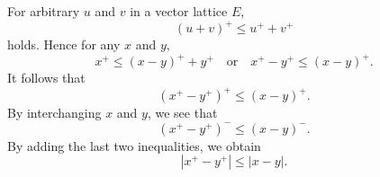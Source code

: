 For arbitrary $u$ and $v$ in a vector lattice $E$, $$(u+v)^+ \leq u^+ + v^+$$ holds. Hence for any $x$ and $y$, $$x^+ \leq (x-y)^+ + y^+ \quad \text{or} \quad x^+ - y^+ \leq (x-y)^+.$$ It follows that $$(x^+ - y^+)^+ \leq (x-y)^+.$$ By interchanging $x$ and $y$, we see that $$(x^+ - y^+)^- \leq (x-y)^-.$$ By adding the last two inequalities, we obtain $$|x^+ - y^+| \leq |x-y|.$$
